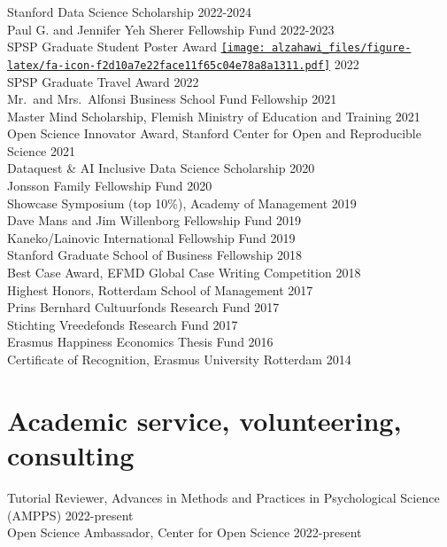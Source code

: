 \documentclass[11pt,a4paper,]{awesome-cv}
\begin{document}
Stanford Data Science Scholarship \hfill 2022-2024\\
Paul G. and Jennifer Yeh Sherer Fellowship Fund \hfill 2022-2023\\
SPSP Graduate Student Poster Award
\href{http://bit.ly/crowd-poster}{\texttt{[image: alzahawi\_files/figure-latex/fa-icon-f2d10a7e22face11f65c04e78a8a1311.pdf]}}
\hfill 2022\\
SPSP Graduate Travel Award \hfill 2022\\
Mr.~and Mrs.~Alfonsi Business School Fund Fellowship \hfill 2021\\
Master Mind Scholarship, Flemish Ministry of Education and Training
\hfill 2021\\
Open Science Innovator Award, Stanford Center for Open and Reproducible
Science \hfill 2021\\
Dataquest \& AI Inclusive Data Science Scholarship \hfill 2020\\
Jonsson Family Fellowship Fund \hfill 2020\\
Showcase Symposium (top 10\%), Academy of Management \hfill 2019\\
Dave Mans and Jim Willenborg Fellowship Fund \hfill 2019\\
Kaneko/Lainovic International Fellowship Fund \hfill 2019\\
Stanford Graduate School of Business Fellowship \hfill 2018\\
Best Case Award, EFMD Global Case Writing Competition \hfill 2018\\
Highest Honors, Rotterdam School of Management \hfill 2017\\
Prins Bernhard Cultuurfonds Research Fund \hfill 2017\\
Stichting Vreedefonds Research Fund \hfill 2017\\
Erasmus Happiness Economics Thesis Fund \hfill 2016\\
Certificate of Recognition, Erasmus University Rotterdam \hfill 2014

\hypertarget{academic-service-volunteering-consulting}{%
\section{Academic service, volunteering,
consulting}\label{academic-service-volunteering-consulting}}

Tutorial Reviewer, Advances in Methods and Practices in Psychological
Science (AMPPS) \hfill 2022-present\\
Open Science Ambassador, Center for Open Science \hfill 2022-present
\end{document}
